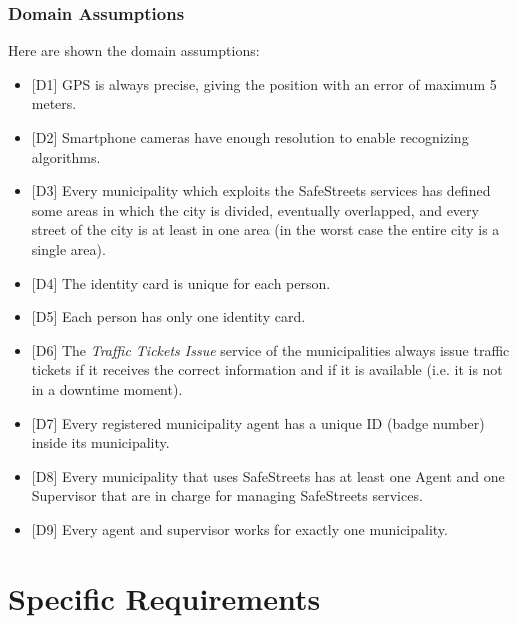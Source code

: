 \documentclass[a4paper]{report}
\begin{document}
\subsection{Domain Assumptions}
\label{subsec:domain-ass} 
Here are shown the domain assumptions:
\begin{itemize}
\item{[D1]} \label{D1} GPS is always precise, giving the position with an error of maximum 5 meters.
\item{[D2]} \label{D2}Smartphone cameras have enough resolution to enable recognizing algorithms.
\item{[D3]} \label{D3}Every municipality which exploits the SafeStreets services has defined some areas in which the city is divided, eventually overlapped, and every street of the city is at least in one area (in the worst case the entire city is a single area).
\item{[D4]} \label{D4}The identity card is unique for each person.
\item{[D5]} \label{D5}Each person has only one identity card.
\item{[D6]} \label{D6}The \textit{Traffic Tickets Issue} service of the municipalities always issue traffic tickets if it receives the correct information and if it is available (i.e. it is not in a downtime moment).
\item{[D7]} \label{D7}Every registered municipality agent has a unique ID (badge number) inside its municipality.
\item{[D8]} \label{D8}Every municipality that uses SafeStreets has at least one Agent and one Supervisor that are in charge for managing SafeStreets services.
\item{[D9]} \label{D9}Every agent and supervisor works for exactly one municipality.
\end{itemize}

\chapter{Specific Requirements}
\end{document}
